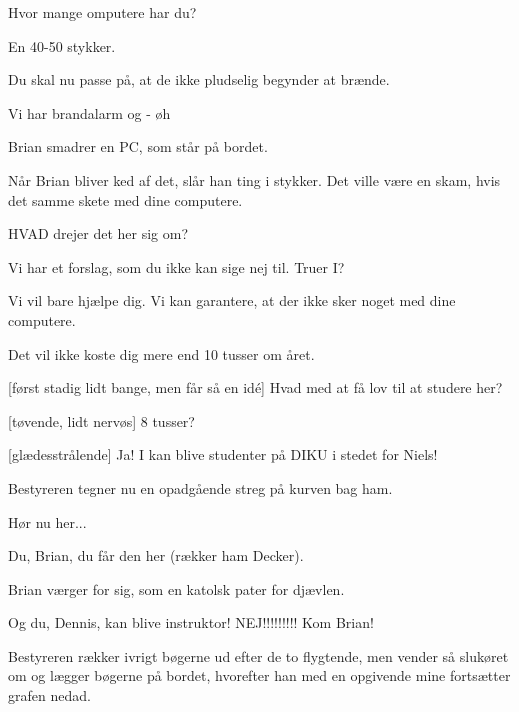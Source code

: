\documentclass[a4paper,11pt]{article}
\begin{document}
\begin{sketch}
 Hvor mange omputere har du?

 En 40-50 stykker.

 Du skal nu passe på, at de ikke pludselig begynder at
brænde. 

 Vi har brandalarm og - øh

\scene Brian smadrer en PC, som står på bordet.

 Når Brian bliver ked af det, slår han ting i stykker.
Det ville være en skam, hvis det samme skete med dine computere.

 HVAD drejer det her sig om?

 Vi har et forslag, som du ikke kan sige nej til.
 Truer I?

 Vi vil bare hjælpe dig. Vi kan garantere, at der ikke
sker noget med dine computere.

 Det vil ikke koste dig mere end 10 tusser om året.

[først stadig lidt bange, men får så en id\'e] Hvad
med at få lov til at studere her?

[tøvende, lidt nervøs] 8 tusser?

[glædesstrålende] Ja!  I kan blive studenter på
DIKU i stedet for Niels! 

\scene
Bestyreren tegner nu en opadgående streg på kurven bag ham.

 Hør nu her...

 Du, Brian, du får den her (rækker ham Decker).

\scene Brian værger for sig, som en katolsk pater for djævlen.

 Og du, Dennis, kan blive instruktor!
 NEJ!!!!!!!!! Kom Brian!

\scene Bestyreren rækker ivrigt bøgerne ud efter de to flygtende,
men vender så slukøret om og lægger bøgerne på bordet, hvorefter
han med en opgivende mine fortsætter grafen nedad.


\end{sketch}
\end{document}
